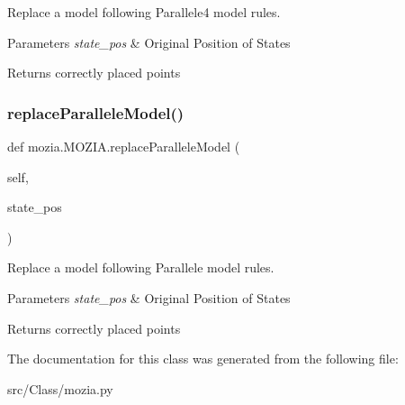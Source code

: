 Replace a model following Parallele4 model rules. 


\begin{DoxyParams}{Parameters}
{\em state\+\_\+pos} & Original Position of States \\
\hline
\end{DoxyParams}
\begin{DoxyReturn}{Returns}
correctly placed points 
\end{DoxyReturn}
\mbox{\label{classmozia_1_1MOZIA_a026b1dfe6089b9c23c619495a7a47c07}} 
\subsubsection{\texorpdfstring{replaceParalleleModel()}{replaceParalleleModel()}}
{\footnotesize\ttfamily def mozia.\+M\+O\+Z\+I\+A.\+replace\+Parallele\+Model (\begin{DoxyParamCaption}\item[{}]{self,  }\item[{}]{state\+\_\+pos }\end{DoxyParamCaption})}



Replace a model following Parallele model rules. 


\begin{DoxyParams}{Parameters}
{\em state\+\_\+pos} & Original Position of States \\
\hline
\end{DoxyParams}
\begin{DoxyReturn}{Returns}
correctly placed points 
\end{DoxyReturn}


The documentation for this class was generated from the following file\+:\begin{DoxyCompactItemize}
\item 
src/\+Class/mozia.\+py\end{DoxyCompactItemize}
